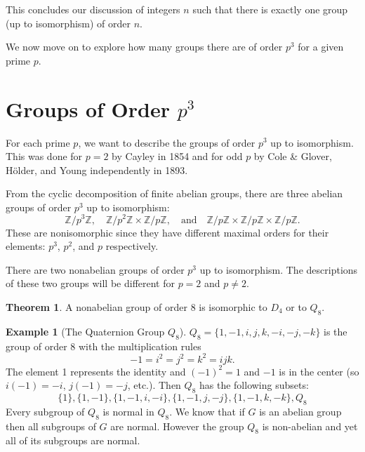 \documentclass[12pt,reqno]{amsart}
\theoremstyle{plain}
\theoremstyle{definition}
\newtheorem{eg}{Example}
\numberwithin{equation}{section}
\newtheorem{theorem}{Theorem}[section]
\begin{document}
\medskip
This concludes our discussion of integers $n$ such that there is exactly one group (up to isomorphism) of order $n$. 

\medskip 
We now move on to explore how many groups there are of order $p^3$ for a given prime $p$.

\section{Groups of Order $p^3$}

For each prime $p$, we want to describe the groups of order $p^3$ up to isomorphism. This was done for $p=2$ by Cayley in 1854 and for odd $p$ by Cole \& Glover, H\"older, and Young independently in 1893.

From the cyclic decomposition of finite abelian groups, there are three abelian groups of order $p^3$ up to isomorphism: \[\mathbb{Z}/p^3\mathbb{Z}, \quad \mathbb{Z}/p^2\mathbb{Z}\times\mathbb{Z}/p\mathbb{Z}, \quad \text{and} \quad  \mathbb{Z}/p\mathbb{Z}\times\mathbb{Z}/p\mathbb{Z}\times\mathbb{Z}/p\mathbb{Z}.\] These are nonisomorphic since they have different maximal orders for their elements: $p^3$, $p^2$, and $p$ respectively.

There are two nonabelian groups of order $p^3$ up to isomorphism. The descriptions of these two groups will be different for $p=2$ and $p\ne2$.

\begin{theorem}
A nonabelian group of order 8 is isomorphic to $D_4$ or to $Q_8$.
\end{theorem}

\begin{eg}[The Quaternion Group $Q_8$]\phantom{.}\newline 
$Q_8=\{1,-1,i,j,k,-i,-j,-k\}$ is the group of order 8 with the multiplication rules \[-1=i^2=j^2=k^2=ijk.\] The element 1 represents the identity and $(-1)^2=1$ and $-1$ is in the center (so $i(-1)=-i$, $j(-1)=-j$, etc.). Then $Q_8$ has the following subsets:
\[ \{1\},\{1,-1\},\{1,-1,i,-i\},\{1,-1,j,-j\},\{1,-1,k,-k\},Q_8 \]
Every subgroup of $Q_8$ is normal in $Q_8$. We know that if $G$ is an abelian group then all subgroups of $G$ are normal. However the group $Q_8$ is non-abelian and yet all of its subgroups are normal.
\end{eg}
\end{document}

